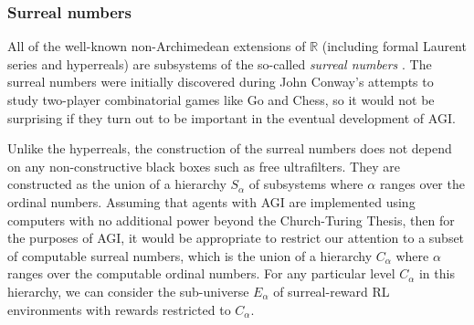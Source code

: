 \documentclass[reqno]{article}
\theoremstyle{definition}
\begin{document}
\subsubsection{Surreal numbers}

All of the
well-known non-Archimedean extensions of $\mathbb R$
(including formal Laurent series and hyperreals) are subsystems of the
so-called \emph{surreal numbers}
\cite{conway} \cite{knuth} \cite{ehrlich2012absolute}. The surreal
numbers were initially discovered during John Conway's attempts to study
two-player combinatorial games like Go and Chess, so it would not be
surprising if they turn out to be important in the eventual development of
AGI.


Unlike the hyperreals,
the construction of the surreal numbers does not depend on any
non-constructive black boxes such as free ultrafilters.
They are constructed as the union of a hierarchy $S_\alpha$ of subsystems where
$\alpha$ ranges over the ordinal numbers. Assuming that agents with AGI are
implemented using computers with no additional power beyond the Church-Turing
Thesis, then for the purposes of AGI, it would be appropriate to restrict our
attention to a subset of computable surreal numbers, which is the union of
a hierarchy $C_\alpha$ where $\alpha$ ranges over the computable ordinal numbers.
For any particular level $C_\alpha$ in this hierarchy, we can consider the
sub-universe $E_\alpha$ of surreal-reward RL environments with rewards restricted
to $C_\alpha$.
\end{document}
